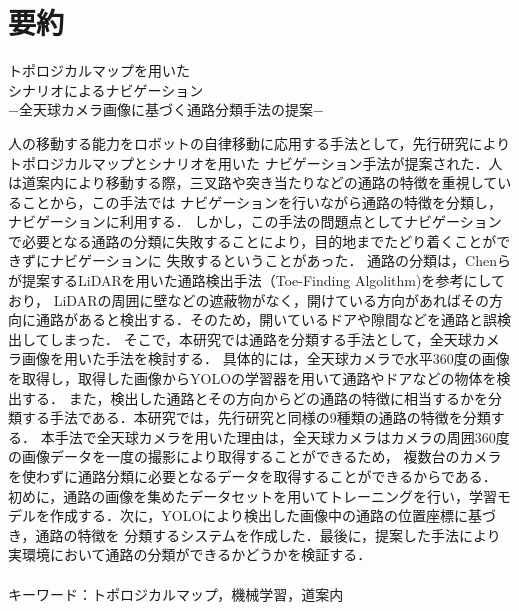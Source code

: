 \documentclass[../main]{subfiles}
\begin{document}
 \chapter*{要約}
 \begin{center}
    {\LARGE トポロジカルマップを用いた\\シナリオによるナビゲーション\\
    \vspace{0.5cm}
    −全天球カメラ画像に基づく通路分類手法の提案−}\\
 \end{center}\vspace{0.8cm}


    人の移動する能力をロボットの自律移動に応用する手法として，先行研究によりトポロジカルマップとシナリオを用いた
    ナビゲーション手法が提案された．人は道案内により移動する際，三叉路や突き当たりなどの通路の特徴を重視していることから，この手法では
    ナビゲーションを行いながら通路の特徴を分類し，ナビゲーションに利用する．
    しかし，この手法の問題点としてナビゲーションで必要となる通路の分類に失敗することにより，目的地までたどり着くことができずにナビゲーションに
    失敗するということがあった．
    通路の分類は，Chenらが提案するLiDARを用いた通路検出手法（Toe-Finding Algolithm)\cite{toe-finding_paper}を参考にしており，
    LiDARの周囲に壁などの遮蔽物がなく，開けている方向があればその方向に通路があると検出する．そのため，開いているドアや隙間などを通路と誤検出してしまった．
    そこで，本研究では通路を分類する手法として，全天球カメラ画像を用いた手法を検討する．
    具体的には，全天球カメラで水平360度の画像を取得し，取得した画像からYOLOの学習器を用いて通路やドアなどの物体を検出する．
    また，検出した通路とその方向からどの通路の特徴に相当するかを分類する手法である．本研究では，先行研究と同様の9種類の通路の特徴を分類する．
    本手法で全天球カメラを用いた理由は，全天球カメラはカメラの周囲360度の画像データを一度の撮影により取得することができるため，
    複数台のカメラを使わずに通路分類に必要となるデータを取得することができるからである．
    初めに，通路の画像を集めたデータセットを用いてトレーニングを行い，学習モデルを作成する．次に，YOLOにより検出した画像中の通路の位置座標に基づき，通路の特徴を
    分類するシステムを作成した．最後に，提案した手法により実環境において通路の分類ができるかどうかを検証する．\\\\

    キーワード：トポロジカルマップ，機械学習，道案内
\end{document}
